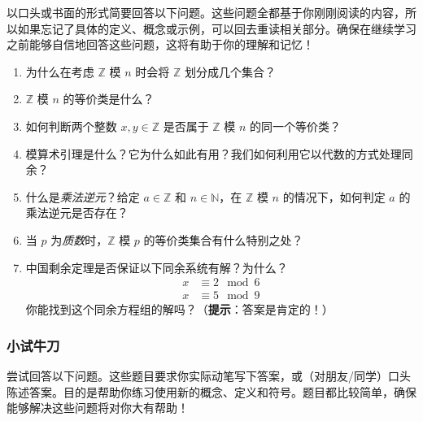 以口头或书面的形式简要回答以下问题。这些问题全都基于你刚刚阅读的内容，所以如果忘记了具体的定义、概念或示例，可以回去重读相关部分。确保在继续学习之前能够自信地回答这些问题，这将有助于你的理解和记忆！

\begin{enumerate}[label=(\arabic*)]
    \item 为什么在考虑 $\mathbb{Z}$ 模 $n$ 时会将 $\mathbb{Z}$ 划分成几个集合？
    \item $\mathbb{Z}$ 模 $n$ 的等价类是什么？
    \item 如何判断两个整数 $x, y \in \mathbb{Z}$ 是否属于 $\mathbb{Z}$ 模 $n$ 的同一个等价类？
    \item 模算术引理是什么？它为什么如此有用？我们如何利用它以代数的方式处理同余？
    \item 什么是\emph{乘法逆元}？给定 $a \in \mathbb{Z}$ 和 $n \in \mathbb{N}$，在 $\mathbb{Z}$ 模 $n$ 的情况下，如何判定 $a$ 的乘法逆元是否存在？
    \item 当 $p$ 为\emph{质数}时，$\mathbb{Z}$ 模 $p$ 的等价类集合有什么特别之处？
    \item 中国剩余定理是否保证以下同余系统有解？为什么？
    \begin{align*}
        x &\equiv 2 \mod 6 \\
        x &\equiv 5 \mod 9
    \end{align*} 
    你能找到这个同余方程组的解吗？（\textbf{提示}：答案是肯定的！）
\end{enumerate}

\subsubsection*{小试牛刀}

尝试回答以下问题。这些题目要求你实际动笔写下答案，或（对朋友/同学）口头陈述答案。目的是帮助你练习使用新的概念、定义和符号。题目都比较简单，确保能够解决这些问题将对你大有帮助！

